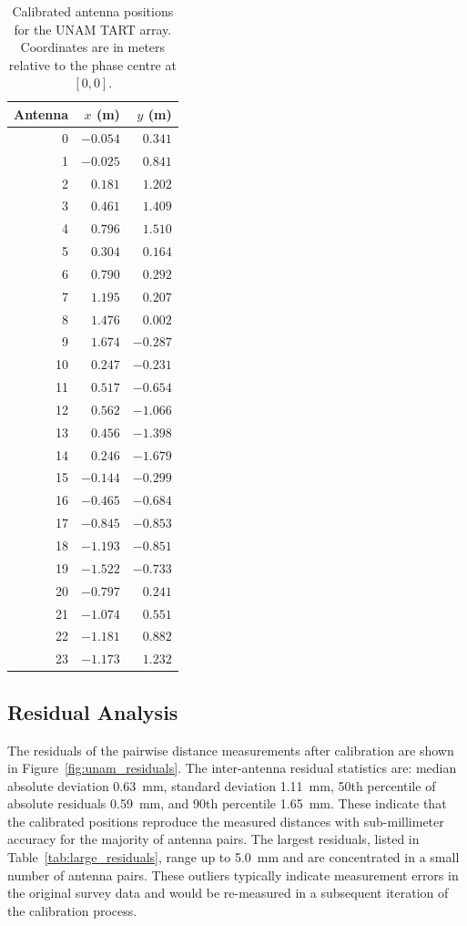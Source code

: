 \documentclass[twocolumn, a4paper,10pt]{article}
\begin{document}
\begin{table}[ht]
	\centering
	\caption{Calibrated antenna positions for the UNAM TART array. Coordinates are in meters relative to the phase centre at $[0,0]$.}
	\label{tab:positions}
	\begin{tabular}{|rrr|}
		\hline
		Antenna & $x$ (m)  & $y$ (m)  \\
		\hline
		0       & $-0.054$ & $0.341$  \\
		1       & $-0.025$ & $0.841$  \\
		2       & $0.181$  & $1.202$  \\
		3       & $0.461$  & $1.409$  \\
		4       & $0.796$  & $1.510$  \\
		5       & $0.304$  & $0.164$  \\
		6       & $0.790$  & $0.292$  \\
		7       & $1.195$  & $0.207$  \\
		8       & $1.476$  & $0.002$  \\
		9       & $1.674$  & $-0.287$ \\
		10      & $0.247$  & $-0.231$ \\
		11      & $0.517$  & $-0.654$ \\
		12      & $0.562$  & $-1.066$ \\
		13      & $0.456$  & $-1.398$ \\
		14      & $0.246$  & $-1.679$ \\
		15      & $-0.144$ & $-0.299$ \\
		16      & $-0.465$ & $-0.684$ \\
		17      & $-0.845$ & $-0.853$ \\
		18      & $-1.193$ & $-0.851$ \\
		19      & $-1.522$ & $-0.733$ \\
		20      & $-0.797$ & $0.241$  \\
		21      & $-1.074$ & $0.551$  \\
		22      & $-1.181$ & $0.882$  \\
		23      & $-1.173$ & $1.232$  \\
		\hline
	\end{tabular}
\end{table}

\subsection{Residual Analysis}

The residuals of the pairwise distance measurements after calibration are shown in Figure~\ref{fig:unam_residuals}. The inter-antenna residual statistics are: median absolute deviation 0.63~mm, standard deviation 1.11~mm, 50th percentile of absolute residuals 0.59~mm, and 90th percentile 1.65~mm. These indicate that the calibrated positions reproduce the measured distances with sub-millimeter accuracy for the majority of antenna pairs. The largest residuals, listed in Table~\ref{tab:large_residuals}, range up to 5.0~mm and are concentrated in a small number of antenna pairs. These outliers typically indicate measurement errors in the original survey data and would be re-measured in a subsequent iteration of the calibration process.
\end{document}

